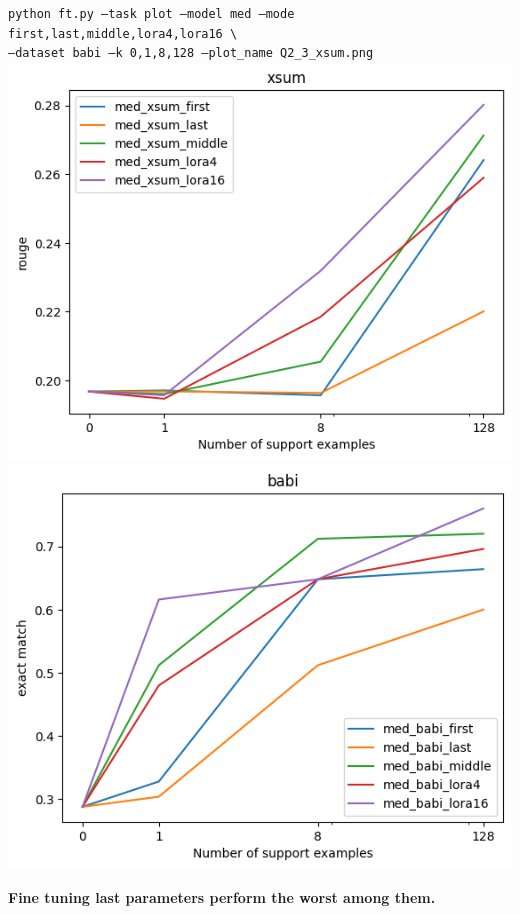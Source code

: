 \documentclass[12pt]{article}
\begin{document}
\begin{enumerate}
    {\small \texttt{python ft.py --task plot --model med --mode first,last,middle,lora4,lora16 \textbackslash \\
    \phantom{asdf}--dataset babi --k 0,1,8,128 --plot\_name Q2\_3\_xsum.png}}\\    
\includegraphics[width=\linewidth]{hw3_starter_code/starter_code/Q2_3_xsum.png}                
\includegraphics[width=\linewidth]{hw3_starter_code/starter_code/Q2_3_babi.png}            
    
    \textbf{\color{red}Fine tuning last parameters perform the worst among them.}

\end{enumerate}
\end{document}
